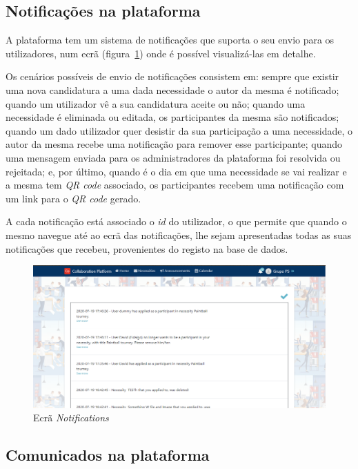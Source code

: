 \subsection{Notificações na plataforma}\label{subsec:implementacao:notificacoes}

A plataforma tem um sistema de notificações que suporta o seu envio para os utilizadores, num ecrã (figura~\ref{fig:notifications}) onde é possível visualizá-las em detalhe. 
\par
Os cenários possíveis de envio de notificações consistem em: 
sempre que existir uma nova candidatura a uma dada necessidade o autor da mesma é notificado; 
quando um utilizador vê a sua candidatura aceite ou não; 
quando uma necessidade é eliminada ou editada, os participantes da mesma são notificados;
quando um dado utilizador quer desistir da sua participação a uma necessidade, o autor da mesma recebe uma notificação para remover esse participante;
quando uma mensagem enviada para os administradores da plataforma foi resolvida ou rejeitada;
e, por último, quando é o dia em que uma necessidade se vai realizar e a mesma tem \textit{QR code} associado, os participantes recebem uma notificação com um link para o \textit{QR code} gerado.
\par
A cada notificação está associado o \textit{id} do utilizador, o que permite que quando o mesmo navegue até ao ecrã das notificações, 
lhe sejam apresentadas todas as suas notificações que recebeu, provenientes do registo na base de dados.

\begin{figure}[H]
  \centering 
  \includegraphics[scale=0.4]{figures/Notifications.png}
  \caption{Ecrã \textit{Notifications}}\label{fig:notifications}
\end{figure}

\newpage

\subsection{Comunicados na plataforma}\label{subsec:implementacao:comunicados}

